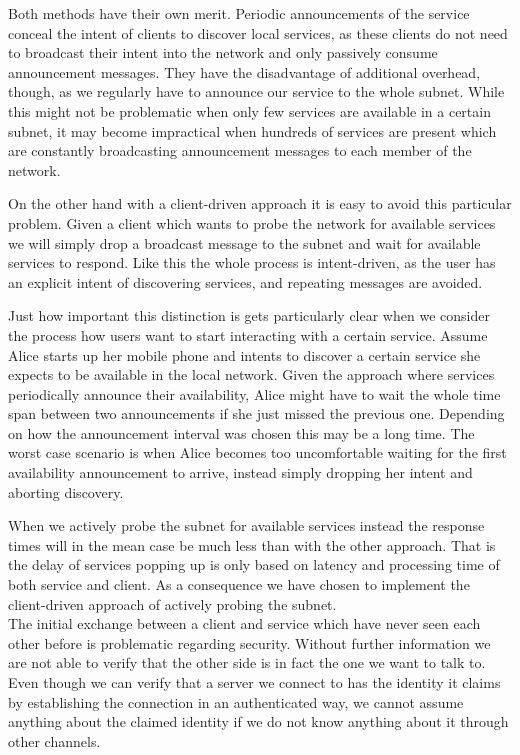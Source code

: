 Both methods have their own merit.
Periodic announcements of the service conceal the intent of clients to discover local services, as these clients do not need to broadcast their intent into the network and only passively consume announcement messages.
They have the disadvantage of additional overhead, though, as we regularly have to announce our service to the whole subnet.
While this might not be problematic when only few services are available in a certain subnet, it may become impractical when hundreds of services are present which are constantly broadcasting announcement messages to each member of the network.

On the other hand with a client-driven approach it is easy to avoid this particular problem.
Given a client which wants to probe the network for available services we will simply drop a broadcast message to the subnet and wait for available services to respond.
Like this the whole process is intent-driven, as the user has an explicit intent of discovering services, and repeating messages are avoided.

Just how important this distinction is gets particularly clear when we consider the process how users want to start interacting with a certain service.
Assume Alice starts up her mobile phone and intents to discover a certain service she expects to be available in the local network.
Given the approach where services periodically announce their availability, Alice might have to wait the whole time span between two announcements if she just missed the previous one.
Depending on how the announcement interval was chosen this may be a long time.
The worst case scenario is when Alice becomes too uncomfortable waiting for the first availability announcement to arrive, instead simply dropping her intent and aborting discovery.

When we actively probe the subnet for available services instead the response times will in the mean case be much less than with the other approach.
That is the delay of services popping up is only based on latency and processing time of both service and client.
As a consequence we have chosen to implement the client-driven approach of actively probing the subnet.\\

The initial exchange between a client and service which have never seen each other before is problematic regarding security.
Without further information we are not able to verify that the other side is in fact the one we want to talk to.
Even though we can verify that a server we connect to has the identity it claims by establishing the connection in an authenticated way, we cannot assume anything about the claimed identity if we do not know anything about it through other channels.

